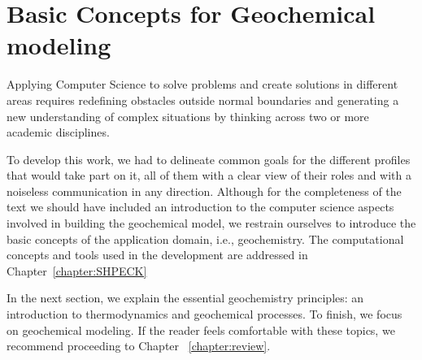 \chapter{Basic Concepts for Geochemical modeling}
\label{chapter:basic}

Applying Computer Science to solve problems and create solutions in different areas requires redefining obstacles outside normal boundaries and generating a new understanding of complex situations by thinking across two or more academic disciplines. 

To develop this work, we had to delineate common goals for the different profiles that would take part on it, all of them with a clear view of their roles and with a noiseless communication in any direction. Although for the completeness of the text we should have included an introduction to the computer science aspects involved in building the geochemical model, we restrain ourselves to introduce the basic concepts of the application domain, i.e., geochemistry. The computational concepts and tools used in the development are addressed in Chapter~\ref{chapter:SHPECK}

In the next section, we explain the essential geochemistry principles: an introduction to thermodynamics and geochemical processes. To finish, we focus on geochemical modeling. If the reader feels comfortable with these topics, we recommend proceeding to Chapter ~\ref{chapter:review}.



